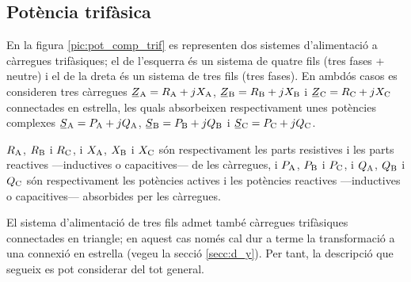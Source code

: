 \subsection{Potència trifàsica}  \label{sec:pot-trif}

En la figura \vref{pic:pot_comp_trif} es representen dos sistemes
d'alimentació a càrregues trifàsiques; el de l'esquerra és un
sistema de quatre fils (tres fases + neutre) i el de la dreta és un sistema
de tres fils (tres fases). En ambdós casos es consideren tres càrregues
$\cmplx{Z}\ped{A} = R\ped{A} + j X\ped{A}$, $\cmplx{Z}\ped{B}=
R\ped{B} + j X\ped{B}$ i $\cmplx{Z}\ped{C}= R\ped{C} + j X\ped{C}$
connectades en estrella, les quals absorbeixen respectivament unes
potències complexes $\cmplx{S}\ped{A} = P\ped{A} + j Q\ped{A}$,
$\cmplx{S}\ped{B}= P\ped{B} + j Q\ped{B}$ i $\cmplx{S}\ped{C}=
P\ped{C} + j Q\ped{C}$.

$R_\mathrm{A}$, $R_\mathrm{B}$ i $R_\mathrm{C}$, i $X_\mathrm{A}$, $X_\mathrm{B}$ i
$X_\mathrm{C}$ són respectivament les parts resistives i les parts
reactives ---inductives o capacitives--- de les càrregues, i $P_\mathrm{A}$,
$P_\mathrm{B}$ i $P_\mathrm{C}$, i $Q_\mathrm{A}$, $Q_\mathrm{B}$ i $Q_\mathrm{C}$ són
respectivament les potències actives i les potències reactives
---inductives o capacitives--- absorbides per les càrregues.

El sistema d'alimentació de tres fils admet també càrregues
trifàsiques connectades en triangle; en aquest cas només cal dur a
terme la transformació a una connexió en estrella (vegeu la secció
\ref{secc:d_y}). Per tant, la descripció que segueix es pot
considerar del tot general.

\begin{center}
    
    \label{pic:pot_comp_trif}
\end{center}

